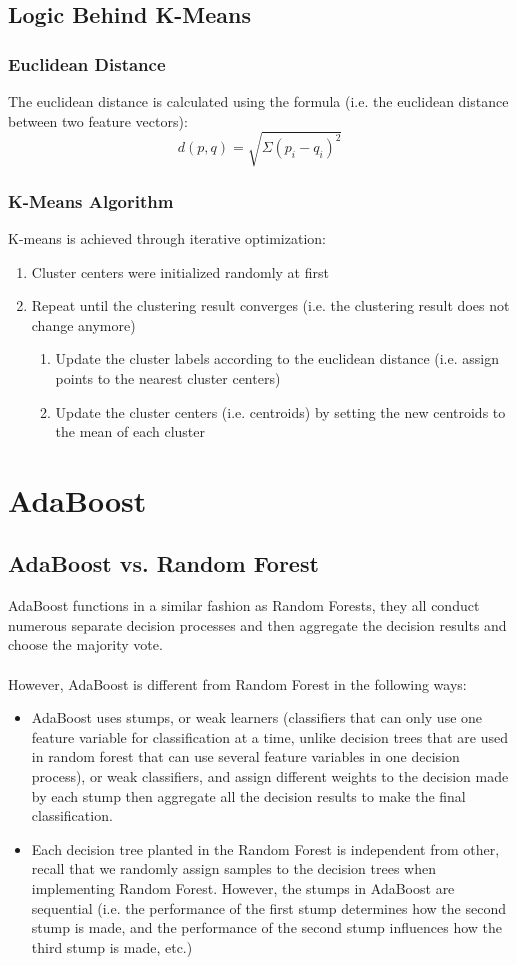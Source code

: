 \documentclass[12pt]{article}
\begin{document}
\subsection{Logic Behind K-Means}
\subsubsection{Euclidean Distance}
The euclidean distance is calculated using the formula (i.e. the euclidean distance between two feature vectors):
$$d(p, q) = \sqrt{\Sigma(p_i - q_i)^2}$$
\subsubsection{K-Means Algorithm}
K-means is achieved through iterative optimization:
\begin{enumerate}
	\item Cluster centers were initialized randomly at first
	\item Repeat until the clustering result converges (i.e. the clustering result does not change anymore)
	\begin{enumerate}
		\item Update the cluster labels according to the euclidean distance (i.e. assign points to the nearest cluster centers)
		\item Update the cluster centers (i.e. centroids) by setting the new centroids to the mean of each cluster
    	\end{enumerate}
\end{enumerate}
\newpage

\section{AdaBoost}
\subsection{AdaBoost vs. Random Forest}
AdaBoost functions in a similar fashion as Random Forests, they all conduct numerous separate decision processes and then aggregate the decision results and choose the majority vote.\\
\\
However, AdaBoost is different from Random Forest in the following ways:
\begin{itemize}
	\item AdaBoost uses stumps, or weak learners (classifiers that can only use one feature variable for classification at a time, unlike decision trees that are used in random forest that can use several feature variables in one decision process), or weak classifiers, and assign different weights to the decision made by each stump then aggregate all the decision results to make the final classification.
	\item Each decision tree planted in the Random Forest is independent from other, recall that we randomly assign samples to the decision trees when implementing Random Forest. However, the stumps in AdaBoost are sequential (i.e. the performance of the first stump determines how the second stump is made, and the performance of the second stump influences how the third stump is made, etc.)
\end{itemize}
\end{document}
